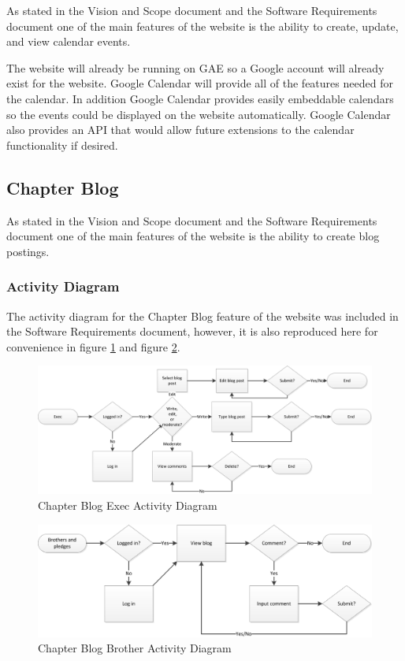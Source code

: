\documentclass{article}
\begin{document}
As stated in the Vision and Scope document and the Software Requirements document one of the main features of the website is the ability to create, update, and view calendar events.

The website will already be running on GAE so a Google account will already exist for the website. Google Calendar will provide all of the features needed for the calendar. In addition Google Calendar provides easily embeddable calendars so the events could be displayed on the website automatically. Google Calendar also provides an API that would allow future extensions to the calendar functionality if desired.

\subsection{Chapter Blog}

As stated in the Vision and Scope document and the Software Requirements document one of the main features of the website is the ability to create blog postings.

\subsubsection{Activity Diagram}
The activity diagram for the Chapter Blog feature of the website was included in the Software Requirements document, however, it is also reproduced here for convenience in figure \ref{fig:blogExecActivityDiagram} and figure \ref{fig:blogBrotherActivityDiagram}.

\FloatBarrier
\begin{figure}
\centering
\includegraphics[scale=.65]{img/activityDiagrams/blogActivity1}
\caption{Chapter Blog Exec Activity Diagram}
\label{fig:blogExecActivityDiagram}
\end{figure}
\FloatBarrier

\FloatBarrier
\begin{figure}
\centering
\includegraphics[scale=.65]{img/activityDiagrams/blogActivity2}
\caption{Chapter Blog Brother Activity Diagram}
\label{fig:blogBrotherActivityDiagram}
\end{figure}
\FloatBarrier
\end{document}
